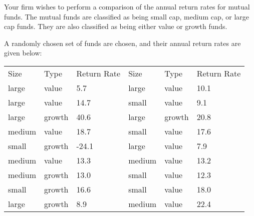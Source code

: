 Your firm wishes to perform a comparison of the annual return rates
for mutual funds. The mutual funds are classified as being small cap,
medium cap, or large cap funds. They are also classified as being
either value or growth funds.

A randomly chosen set of funds are chosen, and their annual return
rates are given below: \\
\begin{tabular}{lll@{\hspace{4em}}lll}
Size   & Type   & Return Rate & Size & Type & Return Rate  \\
large  & value  & 5.7   & large  & value  & 10.1 \\ 
large  & value  & 14.7  & small  & value  & 9.1 \\
large  & growth & 40.6  & large  & growth & 20.8 \\
medium & value  & 18.7  & small  & value  & 17.6 \\
small  & growth & -24.1 & large  & value  & 7.9 \\
medium & value  & 13.3  & medium & value  & 13.2 \\
medium & growth & 13.0  & small  & value  & 12.3 \\
small  & growth & 16.6  & small  & value  & 18.0 \\
large  & growth & 8.9   & medium & value  & 22.4
\end{tabular}

%
%


